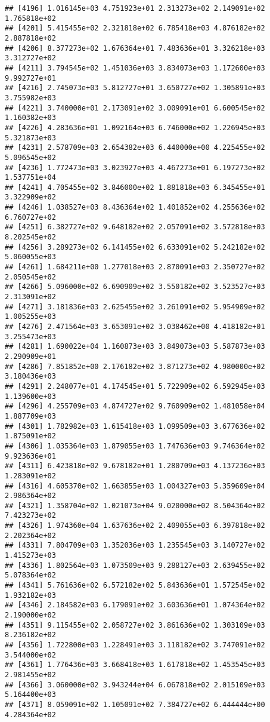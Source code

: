 \documentclass[]{article}
\begin{document}
\begin{verbatim}
## [4196] 1.016145e+03 4.751923e+01 2.313273e+02 2.149091e+02 1.765818e+02
## [4201] 5.415455e+02 2.321818e+02 6.785418e+03 4.876182e+02 2.887818e+02
## [4206] 8.377273e+02 1.676364e+01 7.483636e+01 3.326218e+03 3.312727e+02
## [4211] 3.794545e+02 1.451036e+03 3.834073e+03 1.172600e+03 9.992727e+01
## [4216] 2.745073e+03 5.812727e+01 3.650727e+02 1.305891e+03 3.755982e+03
## [4221] 3.740000e+01 2.173091e+02 3.009091e+01 6.600545e+02 1.160382e+03
## [4226] 4.283636e+01 1.092164e+03 6.746000e+02 1.226945e+03 5.321873e+03
## [4231] 2.578709e+03 2.654382e+03 6.440000e+00 4.225455e+02 5.096545e+02
## [4236] 1.772473e+03 3.023927e+03 4.467273e+01 6.197273e+02 1.537751e+04
## [4241] 4.705455e+02 3.846000e+02 1.881818e+03 6.345455e+01 3.322909e+02
## [4246] 1.038527e+03 8.436364e+02 1.401852e+02 4.255636e+02 6.760727e+02
## [4251] 6.382727e+02 9.648182e+02 2.057091e+02 3.572818e+03 8.202545e+02
## [4256] 3.289273e+02 6.141455e+02 6.633091e+02 5.242182e+02 5.060055e+03
## [4261] 1.684211e+00 1.277018e+03 2.870091e+03 2.350727e+02 2.050545e+02
## [4266] 5.096000e+02 6.690909e+02 3.550182e+02 3.523527e+03 2.313091e+02
## [4271] 3.181836e+03 2.625455e+02 3.261091e+02 5.954909e+02 1.005255e+03
## [4276] 2.471564e+03 3.653091e+02 3.038462e+00 4.418182e+01 3.255473e+03
## [4281] 1.690022e+04 1.160873e+03 3.849073e+03 5.587873e+03 2.290909e+01
## [4286] 7.851852e+00 2.176182e+02 3.871273e+02 4.980000e+02 3.180436e+03
## [4291] 2.248077e+01 4.174545e+01 5.722909e+02 6.592945e+03 1.139600e+03
## [4296] 4.255709e+03 4.874727e+02 9.760909e+02 1.481058e+04 1.887709e+03
## [4301] 1.782982e+03 1.615418e+03 1.099509e+03 3.677636e+02 1.875091e+02
## [4306] 1.035364e+03 1.879055e+03 1.747636e+03 9.746364e+02 9.923636e+01
## [4311] 6.423818e+02 9.678182e+01 1.280709e+03 4.137236e+03 1.283091e+02
## [4316] 4.605370e+02 1.663855e+03 1.004327e+03 5.359609e+04 2.986364e+02
## [4321] 1.358704e+02 1.021073e+04 9.020000e+02 8.504364e+02 7.423273e+02
## [4326] 1.974360e+04 1.637636e+02 2.409055e+03 6.397818e+02 2.202364e+02
## [4331] 7.804709e+03 1.352036e+03 1.235545e+03 3.140727e+02 1.415273e+03
## [4336] 1.802564e+03 1.073509e+03 9.288127e+03 2.639455e+02 5.078364e+02
## [4341] 5.761636e+02 6.572182e+02 5.843636e+01 1.572545e+02 1.932182e+03
## [4346] 2.184582e+03 6.179091e+02 3.603636e+01 1.074364e+02 2.190000e+02
## [4351] 9.115455e+02 2.058727e+02 3.861636e+02 1.303109e+03 8.236182e+02
## [4356] 1.722800e+03 1.228491e+03 3.118182e+02 3.747091e+02 3.544000e+02
## [4361] 1.776436e+03 3.668418e+03 1.617818e+02 1.453545e+03 2.981455e+02
## [4366] 3.060000e+02 3.943244e+04 6.067818e+02 2.015109e+03 5.164400e+03
## [4371] 8.059091e+02 1.105091e+02 7.384727e+02 6.444444e+00 4.284364e+02
\end{verbatim}
\end{document}
